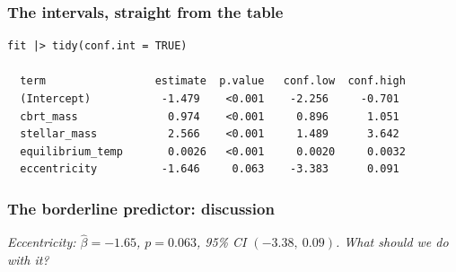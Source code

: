 \documentclass[slidestop,compress,mathserif]{beamer}
\begin{document}
\begin{frame}[fragile]
\frametitle{The intervals, straight from the table}

\begin{Verbatim}[fontsize=\scriptsize]
fit |> tidy(conf.int = TRUE)

  term                 estimate  p.value   conf.low  conf.high
  (Intercept)           -1.479    <0.001    -2.256     -0.701
  cbrt_mass              0.974    <0.001     0.896      1.051
  stellar_mass           2.566    <0.001     1.489      3.642
  equilibrium_temp       0.0026   <0.001     0.0020     0.0032
  eccentricity          -1.646     0.063    -3.383      0.091
\end{Verbatim}

\pause
\vspace{0.2em}

\end{frame}


\begin{frame}
\frametitle{The borderline predictor: discussion}

\emph{Eccentricity: $\hat\beta = -1.65$, $p = 0.063$, 95\% CI $(-3.38,\ 0.09)$. What should we do with it?}

\pause
\vspace{0.5em}

\end{frame}
\end{document}
